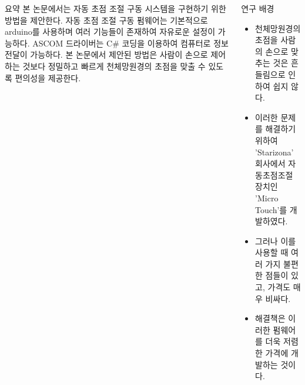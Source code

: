 \documentclass{gshs_poster_beamer}
\begin{document}
\pagestyle{fancy}
\maketitle

\begin{columns}[T]



\begin{posterbox}[colbacktitle=orange!70,coltitle=black,colback=orange!5]{요약}
본 논문에서는 자동 초점 조절 구동 시스템을 구현하기 위한 방법을 제안한다. 자동 초점 조절 구동 펌웨어는 기본적으로 arduino를 사용하며 여러 기능들이 존재하여 자유로운 설정이 가능하다. ASCOM 드라이버는 C\# 코딩을 이용하여 컴퓨터로 정보 전달이 가능하다. 본 논문에서 제안된 방법은 사람이 손으로 제어하는 것보다 정밀하고 빠르게 천체망원경의 초점을 맞출 수 있도록 편의성을 제공한다.
\end{posterbox}

\vspace{1em}

\begin{posterbox}[colbacktitle=magenta!60,coltitle=black,colback=magenta!5]{연구 배경}
\begin{itemize}
	\item 천체망원경의 초점을 사람의 손으로 맞추는 것은 흔들림으로 인하여 쉽지 않다.
	\item 이러한 문제를 해결하기 위하여 'Starizona' 회사에서 자동초점조절 장치인 'Micro Touch'를 개발하였다.
	\item 그러나 이를 사용할 때 여러 가지 불편한 점들이 있고, 가격도 매우 비싸다.
	\item 해결책은 이러한 펌웨어를 더욱 저렴한 가격에 개발하는 것이다.
\end{itemize}
\end{posterbox}

\vspace{1em}


\end{columns}
\end{document}
